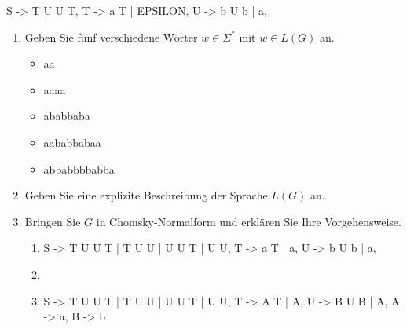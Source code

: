 \documentclass{bschlangaul-aufgabe}
\begin{document}
\begin{bProduktionsRegeln}
S -> T U U T,
T -> a T | EPSILON,
U -> b U b | a,
\end{bProduktionsRegeln}
\begin{enumerate}


\item Geben Sie fünf verschiedene Wörter $w \in \Sigma^*$ mit $w \in
L(G)$ an.

\begin{bAntwort}
\begin{itemize}
\item aa
\item aaaa
\item ababbaba
\item aababbabaa
\item abbabbbbabba
\end{itemize}
\end{bAntwort}


\item Geben Sie eine explizite Beschreibung der Sprache $L(G)$ an.

\begin{bAntwort}
\end{bAntwort}


\item Bringen Sie $G$ in Chomsky-Normalform und erklären Sie Ihre
Vorgehensweise.

\begin{bAntwort}
\begin{enumerate}
\item {}

\begin{bProduktionsRegeln}
S -> T U U T | T U U | U U T | U U,
T -> a T | a,
U -> b U b | a,
\end{bProduktionsRegeln}

\item {}

\bNichtsZuTun

\item {}

\begin{bProduktionsRegeln}
S -> T U U T | T U U | U U T | U U,
T -> A T | A,
U -> B U B | A,
A -> a,
B -> b
\end{bProduktionsRegeln}


\end{enumerate}
\end{bAntwort}
\end{enumerate}
\end{document}
